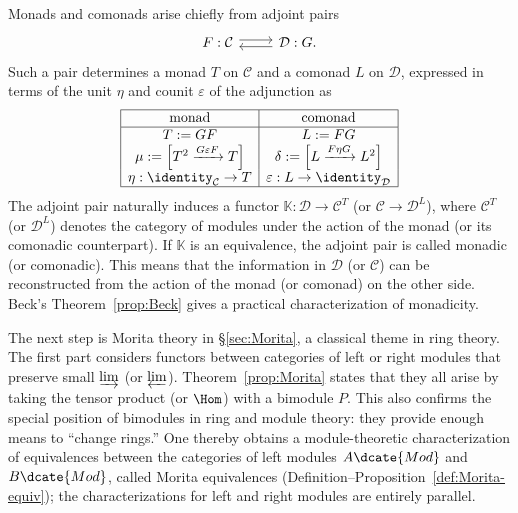 Monads and comonads arise chiefly from adjoint pairs
\[\begin{tikzcd}
	F: \mathcal{C} \arrow[shift left, r] & \mathcal{D}: G \arrow[shift left, l].
\end{tikzcd}\]
Such a pair determines a monad $T$ on $\mathcal{C}$ and a comonad $L$ on
$\mathcal{D}$, expressed in terms of the unit $\eta$ and counit
$\varepsilon$ of the adjunction as
\[\begin{array}{|c|c|}\hline
	\text{monad} & \text{comonad} \\ \hline
	T := GF & L := FG \\
	\mu := \left[ T^2 \xrightarrow{G\varepsilon F} T \right] & \delta := \left[ L \xrightarrow{F\eta G} L^2 \right] \\
	\eta : \identity_{\mathcal{C}} \to T & \varepsilon: L \to \identity_{\mathcal{D}} \\ \hline 
\end{array}\]
The adjoint pair naturally induces a functor
$\mathbb{K}:\mathcal{D}\to\mathcal{C}^T$ (or
$\mathcal{C}\to\mathcal{D}^L$), where $\mathcal{C}^T$ (or
$\mathcal{D}^L$) denotes the category of modules under the action of the
monad (or its comonadic counterpart). If $\mathbb{K}$ is an equivalence, the
adjoint pair is called monadic (or comonadic). This means that the information
in $\mathcal{D}$ (or $\mathcal{C}$) can be reconstructed from the action of
the monad (or comonad) on the other side. Beck's
Theorem~\ref{prop:Beck} gives a practical characterization of monadicity.

The next step is Morita theory in \S\ref{sec:Morita}, a classical theme in
ring theory. The first part considers functors between categories of left or
right modules that preserve small $\varinjlim$ (or $\varprojlim$).
Theorem~\ref{prop:Morita} states that they all arise by taking the tensor
product (or $\Hom$) with a bimodule $P$. This also confirms the special
position of bimodules in ring and module theory: they provide enough means to
“change rings.” One thereby obtains a module-theoretic characterization of
equivalences between the categories of left modules $A\dcate{Mod}$ and
$B\dcate{Mod}$, called Morita equivalences
(Definition--Proposition~\ref{def:Morita-equiv}); the characterizations for
left and right modules are entirely parallel.


